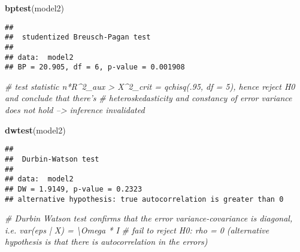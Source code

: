 \documentclass[
]{article}
\newenvironment{Shaded}{\begin{snugshade}}{\end{snugshade}}
\newcommand{\CommentTok}[1]{\textcolor[rgb]{0.56,0.35,0.01}{\textit{#1}}}
\newcommand{\KeywordTok}[1]{\textcolor[rgb]{0.13,0.29,0.53}{\textbf{#1}}}
\newcommand{\NormalTok}[1]{#1}
\begin{document}
\begin{Shaded}
\begin{Highlighting}[]
\KeywordTok{bptest}\NormalTok{(model2)}
\end{Highlighting}
\end{Shaded}

\begin{verbatim}
## 
##  studentized Breusch-Pagan test
## 
## data:  model2
## BP = 20.905, df = 6, p-value = 0.001908
\end{verbatim}

\begin{Shaded}
\begin{Highlighting}[]
\CommentTok{# test statistic n*R^2_aux > X^2_crit = qchisq(.95, df = 5), hence reject H0 and conclude that there's}
\CommentTok{# heteroskedasticity and constancy of error variance does not hold --> inference invalidated}

\KeywordTok{dwtest}\NormalTok{(model2)}
\end{Highlighting}
\end{Shaded}

\begin{verbatim}
## 
##  Durbin-Watson test
## 
## data:  model2
## DW = 1.9149, p-value = 0.2323
## alternative hypothesis: true autocorrelation is greater than 0
\end{verbatim}

\begin{Shaded}
\begin{Highlighting}[]
\CommentTok{# Durbin Watson test confirms that the error variance-covariance is diagonal, i.e. var(eps | X) =  \textbackslash{}Omega * I}
\CommentTok{# fail to reject H0: rho = 0 (alternative hypothesis is that there is autocorrelation in the errors)}
\end{Highlighting}
\end{Shaded}
\end{document}
